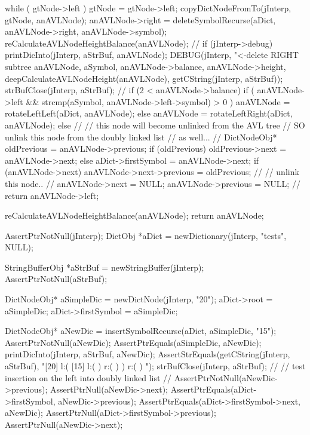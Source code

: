 {{{      while ( gtNode->left ) {
        gtNode = gtNode->left;
      }
      copyDictNodeFromTo(jInterp, gtNode, anAVLNode);
      anAVLNode->right =
        deleteSymbolRecurse(aDict, anAVLNode->right, anAVLNode->symbol);
      reCalculateAVLNodeHeightBalance(anAVLNode);
      //
      if (jInterp->debug) {
        printDicInto(jInterp, aStrBuf, anAVLNode);
        DEBUG(jInterp, "<-delete RIGHT subtree %
            anAVLNode, aSymbol, anAVLNode->balance,
            anAVLNode->height, deepCalculateAVLNodeHeight(anAVLNode),
            getCString(jInterp, aStrBuf));
        strBufClose(jInterp, aStrBuf);
      }
      //
      if (2 < anAVLNode->balance) {
        if (
          anAVLNode->left &&
          strcmp(aSymbol, anAVLNode->left->symbol) > 0
          ) {
          anAVLNode = rotateLeftLeft(aDict, anAVLNode);
        } else {
          anAVLNode = rotateLeftRight(aDict, anAVLNode);
        }
      }
    } else {
      //
      // this node will become unlinked from the AVL tree
      // SO unlink this node from the doubly linked list
      // as well...
      //
      DictNodeObj* oldPrevious           = anAVLNode->previous;
      if (oldPrevious) oldPrevious->next = anAVLNode->next;
      else aDict->firstSymbol            = anAVLNode->next;
      if (anAVLNode->next) {
        anAVLNode->next->previous        = oldPrevious;
      }
      //
      // unlink this node..
      //
      anAVLNode->next     = NULL;
      anAVLNode->previous = NULL;
      //
      return anAVLNode->left;
    }
  }

  reCalculateAVLNodeHeightBalance(anAVLNode);
  return anAVLNode;
}
\stopCCode

\startCTest
  AssertPtrNotNull(jInterp);
  DictObj *aDict = newDictionary(jInterp, "tests", NULL);

  StringBufferObj *aStrBuf = newStringBuffer(jInterp);
  AssertPtrNotNull(aStrBuf);
  
  DictNodeObj* aSimpleDic = newDictNode(jInterp, "20");
  aDict->root             = aSimpleDic;
  aDict->firstSymbol      = aSimpleDic;

  DictNodeObj* aNewDic = insertSymbolRecurse(aDict, aSimpleDic, "15");
  AssertPtrNotNull(aNewDic);
  AssertPtrEquals(aSimpleDic, aNewDic);
  printDicInto(jInterp, aStrBuf, aNewDic);
  AssertStrEquals(getCString(jInterp, aStrBuf),
  "[20] l:( [15] l:(  ) r:(  )  ) r:(  ) ");
  strBufClose(jInterp, aStrBuf);
  //
  // test insertion on the left into doubly linked list
  //
  AssertPtrNotNull(aNewDic->previous);
  AssertPtrNull(aNewDic->next);
  AssertPtrEquals(aDict->firstSymbol, aNewDic->previous);
  AssertPtrEquals(aDict->firstSymbol->next, aNewDic);
  AssertPtrNull(aDict->firstSymbol->previous);
  AssertPtrNull(aNewDic->next);

